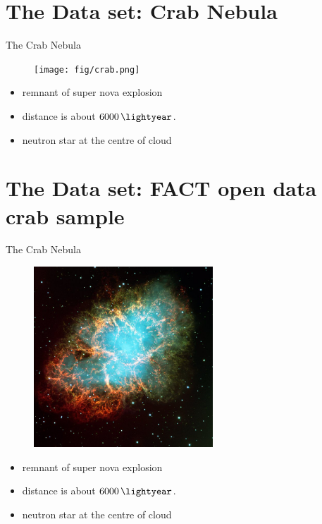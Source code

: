\section{The Data set: Crab Nebula}

\begin{frame}[t]{The Crab Nebula}
  \begin{multicols}{2}
    \begin{figure}
        \centering
        \texttt{[image: fig/crab.png]}
    \end{figure}
    \columnbreak
    \vspace*{\fill}
      \begin{itemize}
        \item remnant of super nova explosion
        \item distance is about $\SI{6000}{\lightyear}$.
        \item neutron star at the centre of cloud
    \end{itemize}
    \vspace*{\fill}
  \end{multicols}
\end{frame}

\section{The Data set: FACT open data crab sample}

\begin{frame}[t]{The Crab Nebula}
  \begin{multicols}{2}
    \begin{figure}
        \centering
        \includegraphics[width=0.6\textwidth]{fig/crab.jpg}
    \end{figure}
    \columnbreak
    \vspace*{\fill}
      \begin{itemize}
        \item remnant of super nova explosion
        \item distance is about $\SI{6000}{\lightyear}$.
        \item neutron star at the centre of cloud
    \end{itemize}
    \vspace*{\fill}
  \end{multicols}
\end{frame}

